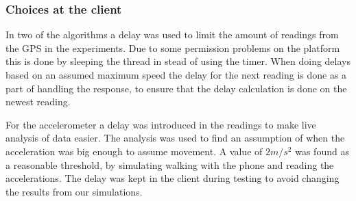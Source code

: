 \subsubsection{Choices at the client}
In two of the algorithms a delay was used to limit the amount of readings from the GPS in the experiments. Due to some permission problems on the platform this is done by sleeping the thread in stead of using the timer. When doing delays based on an assumed maximum speed the delay for the next reading is done as a part of handling the response, to ensure that the delay calculation is done on the newest reading.

For the accelerometer a delay was introduced in the readings to make live analysis of data easier. The analysis was used to find an assumption of when the acceleration was big enough to assume movement. A value of $2 m/s^2$ was found as a reasonable threshold, by simulating walking with the phone and reading the accelerations. The delay was kept in the client during testing to avoid changing the results from our simulations.